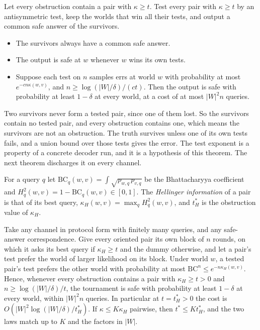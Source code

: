 \begin{theorem}
\label{thm:upper}
Let every obstruction contain a pair with $\kappa\ge t$. Test every pair with $\kappa\ge t$ by
an antisymmetric test, keep the worlds that win all their tests, and output a common safe
answer of the survivors.
\begin{itemize}
\item The survivors always have a common safe answer.
\item The output is safe at $w$ whenever $w$ wins its own tests.
\item Suppose each test on $n$ samples errs at world $w$ with probability at most
$e^{-cn\kappa(w,v)}$, and $n\ge\log(|W|/\delta)/(ct)$. Then the output is safe with probability
at least $1-\delta$ at every world, at a cost of at most $|W|^{2}n$ queries.
\end{itemize}
\end{theorem}


Two survivors never form a tested pair, since one of them lost. So the survivors contain no
tested pair, and every obstruction contains one, which means the survivors are not an
obstruction. The truth survives unless one of its own tests fails, and a union bound over those
tests gives the error. The test exponent is a property of a concrete decoder run, and it is a
hypothesis of this theorem. The next theorem discharges it on every channel.

For a query $q$ let $\mathrm{BC}_{q}(w,v)=\int\sqrt{p_{w,q}\,p_{v,q}}$ be the Bhattacharyya
coefficient and $H^{2}_{q}(w,v)=1-\mathrm{BC}_{q}(w,v)\in[0,1]$. The \emph{Hellinger
information} of a pair is that of its best query, $\kappa_{H}(w,v)=\max_{q}H^{2}_{q}(w,v)$, and
$t^{*}_{H}$ is the obstruction value of $\kappa_{H}$.

\begin{theorem}
\label{thm:hellupper}
Take any channel in protocol form with finitely many queries, and any safe-answer
correspondence. Give every oriented pair its own block of $n$ rounds, on which it asks its best
query if $\kappa_{H}\ge t$ and the dummy otherwise, and let a pair's test prefer the world of
larger likelihood on its block. Under world $w$, a tested pair's test prefers the other world
with probability at most $\mathrm{BC}^{n}\le e^{-n\kappa_{H}(w,v)}$. Hence, whenever every
obstruction contains a pair with $\kappa_{H}\ge t>0$ and $n\ge\log(|W|/\delta)/t$, the
tournament is safe with probability at least $1-\delta$ at every world, within $|W|^{2}n$
queries. In particular at $t=t^{*}_{H}>0$ the cost is $O(|W|^{2}\log(|W|/\delta)/t^{*}_{H})$.
If $\kappa\le K\kappa_{H}$ pairwise, then $t^{*}\le Kt^{*}_{H}$, and the two laws match up to $K$
and the factors in $|W|$.
\end{theorem}

